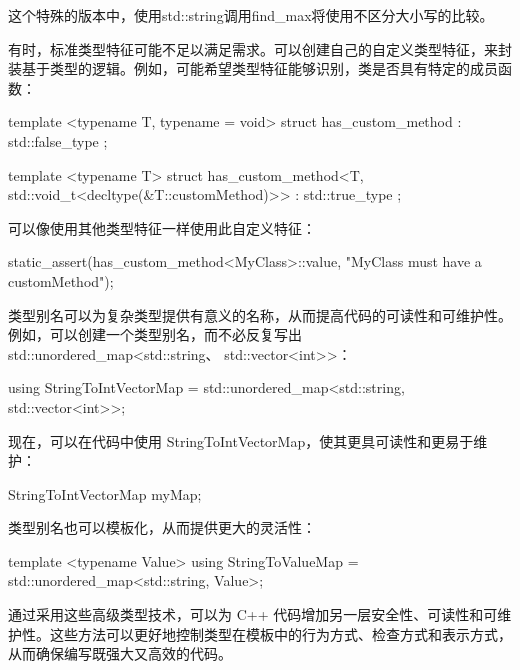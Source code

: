 这个特殊的版本中，使用std::string调用find\_max将使用不区分大小写的比较。


有时，标准类型特征可能不足以满足需求。可以创建自己的自定义类型特征，来封装基于类型的逻辑。例如，可能希望类型特征能够识别，类是否具有特定的成员函数：

\begin{cpp}
template <typename T, typename = void>
struct has_custom_method : std::false_type {};

template <typename T>
struct has_custom_method<T, std::void_t<decltype(&T::customMethod)>> : std::true_type {};
\end{cpp}

可以像使用其他类型特征一样使用此自定义特征：

\begin{cpp}
static_assert(has_custom_method<MyClass>::value, "MyClass must have a customMethod");
\end{cpp}


类型别名可以为复杂类型提供有意义的名称，从而提高代码的可读性和可维护性。例如，可以创建一个类型别名，而不必反复写出 std::unordered\_map<std::string、 std::vector<int>{}>：

\begin{cpp}
using StringToIntVectorMap = std::unordered_map<std::string, std::vector<int>>;
\end{cpp}

现在，可以在代码中使用 StringToIntVectorMap，使其更具可读性和更易于维护：

\begin{cpp}
StringToIntVectorMap myMap;
\end{cpp}

类型别名也可以模板化，从而提供更大的灵活性：

\begin{cpp}
template <typename Value>
using StringToValueMap = std::unordered_map<std::string, Value>;
\end{cpp}

通过采用这些高级类型技术，可以为 C++ 代码增加另一层安全性、可读性和可维护性。这些方法可以更好地控制类型在模板中的行为方式、检查方式和表示方式，从而确保编写既强大又高效的代码。











